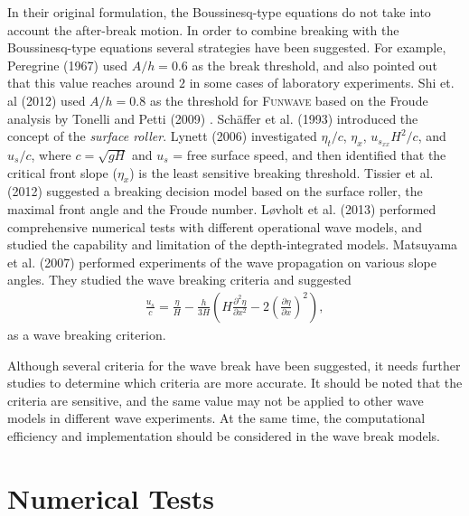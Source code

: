 \documentclass[review]{elsarticle}
\begin{document}
In their original formulation, 
the Boussinesq-type equations do not take into account 
the after-break motion.
In order to combine breaking with  the Boussinesq-type equations
several strategies have been suggested. 
For example, 
Peregrine (1967) \citep{peregrine1967long} used $A/h=0.6$ 
as the break threshold, and also pointed out that
this value reaches around $2$ in some cases of laboratory experiments. 
Shi et. al (2012) \citep{shi2012high} used 
$A/h = 0.8$ as the threshold 
for \textsc{Funwave} based on the Froude analysis 
by Tonelli and Petti (2009) \citep{tonelli2009hybrid}.
Sch{\"a}ffer et al. (1993) \cite{schaffer1993boussinesq} 
introduced the concept of the {\em surface roller}.
Lynett (2006) \cite{lynett2006nearshore} 
investigated $\eta_t/c$, $\eta_x$, $u_{s_{xx}} H^2/c$, and $u_s/c$, 
where $c=\sqrt{gH}$ and $u_s$ = free surface speed,
and then identified that the critical front slope ($\eta_x$) 
is the least sensitive breaking threshold. 
Tissier et al. (2012) \cite{tissier2012new} suggested
a breaking decision model based on the surface roller,
the maximal front angle and the Froude number.
L{\o}vholt et al. (2013) performed comprehensive numerical tests
with different operational wave models, 
and studied the capability and limitation of 
the depth-integrated models. 
Matsuyama et al. (2007) \cite{matsuyama2007study} performed experiments
of the wave propagation on various slope angles. 
They studied the wave breaking criteria and suggested 
\begin{align*}
\frac{u_s}{c} = \frac{\eta}{H} - \frac{h}{3H}
\left(
H\frac{\partial^2 \eta}{\partial x^2} - 2 \left(\frac{\partial \eta}{\partial x} \right)^2
\right),
\end{align*}
as a wave breaking criterion.

Although several criteria for the wave break have been suggested,
it needs further studies to determine which criteria are more accurate.
It should be noted 
that the criteria are sensitive, and 
the same value may not be applied 
to other wave models in different wave experiments.
At the same time, the computational efficiency and implementation
should be considered in the wave break models. 

\section{Numerical Tests}
\end{document}
